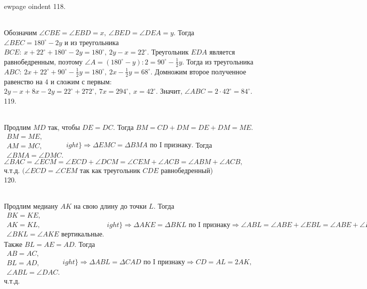 ewpage
oindent
118.\begin{figure}[ht!]
\end{figure}\\
Обозначим $\angle CBE=\angle EBD=x,\ \angle BED=\angle DEA=y.$ Тогда $\angle BEC=180^\circ-2y$ и из треугольника $BCE:\ x+22^\circ+180^\circ-2y=180^\circ,\ 2y-x=22^\circ.$ Треугольник $EDA$ является равнобедренным, поэтому $\angle A=(180^\circ-y):2=90^\circ-\frac{1}{2}y.$ Тогда из треугольника $ABC:\ 2x+22^\circ+90^\circ-\frac{1}{2}y=180^\circ,\ 2x-\frac{1}{2}y=68^\circ.$ Домножим второе полученное равенство на 4 и сложим с первым: $2y-x+8x-2y=22^\circ+272^\circ,\ 7x=294^\circ,\ x=42^\circ.$ Значит, $\angle ABC=2\cdot42^\circ=84^\circ.$\\
119. \begin{figure}[ht!]
\end{figure}\\
Продлим $MD$ так, чтобы $DE=DC.$ Тогда $BM=CD+DM=DE+DM=ME.$\\ $\left.\begin{array}{l}BM=ME,\\
AM=MC,\\
\angle BMA=\angle DMC. \end{array}
ight\}\Rightarrow \Delta EMC=\Delta BMA\text{ по I признаку.}$ Тогда
$\angle BAC=\angle ECM=\angle ECD+\angle DCM=\angle CEM+\angle ACB=\angle ABM+\angle ACB,$ ч.т.д. $(\angle ECD=\angle CEM$ так как треугольник $CDE$ равнобедренный)\\
120. \begin{figure}[ht!]
\end{figure}\\
Продлим медиану $AK$ на свою длину до точки $L.$ Тогда $\left.\begin{array}{l}BK=KE,\\
AK=KL,\\
\angle BKL=\angle AKE\text{ вертикальные.} \end{array}
ight\}\Rightarrow \Delta AKE=\Delta BKL\text{ по I признаку}\Rightarrow
\angle ABL=\angle ABE+\angle EBL=\angle ABE+\angle BEA=\angle DAC.$ Также  $BL=AE=AD.$ Тогда
$\left.\begin{array}{l}AB=AC,\\
BL=AD,\\
\angle ABL=\angle DAC. \end{array}
ight\}\Rightarrow \Delta ABL=\Delta CAD\text{ по I признаку}\Rightarrow CD=AL=2AK,$ ч.т.д.
